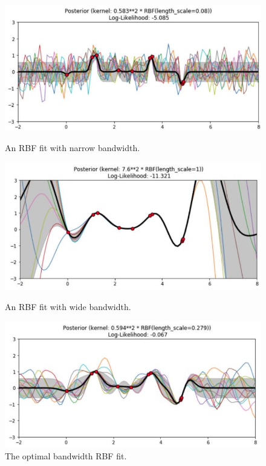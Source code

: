 \documentclass[11pt]{article}
\theoremstyle{plain} %
\theoremstyle{remark}
\begin{document}
\begin{figure}[!htp]
  \begin{minipage}{0.33\textwidth}
    \centering
    \includegraphics[width=\textwidth]{images/2023_11_26_5b299dbd302e8f129737g-60}
    \caption{An RBF fit with narrow bandwidth.}
    \label{fig:RBF Kernel narrow bandwidth}
  \end{minipage}
  \begin{minipage}{0.33\textwidth}
    \centering
    \includegraphics[width=\textwidth]{images/2023_11_26_5b299dbd302e8f129737g-61}
    \caption{An RBF fit with wide bandwidth.}
    \label{fig:RBF Kernel wide bandwidth}
  \end{minipage}
  \begin{minipage}{0.33\textwidth}
    \centering
    \includegraphics[width=\textwidth]{images/2023_11_26_5b299dbd302e8f129737g-62}
    \caption{The optimal bandwidth RBF fit.}
    \label{fig:RBF Kernel optimal bandwidth}
  \end{minipage}
\end{figure}
\end{document}
